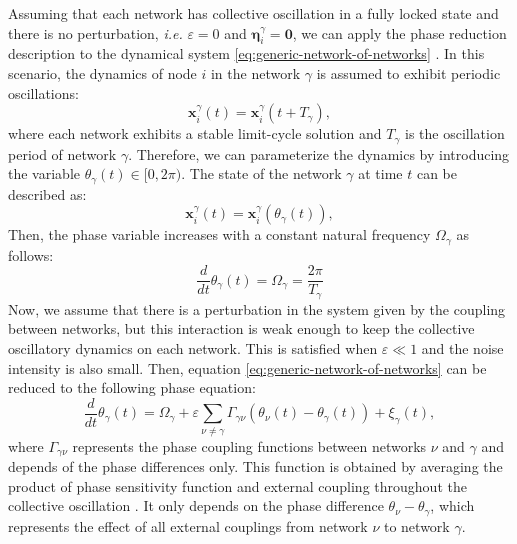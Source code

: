 \documentclass[../main.tex]{subfiles}
\begin{document}
Assuming that each network has collective oscillation in a fully locked state and there is no perturbation, \textit{i.e.} $\varepsilon =0$ and $\mathbf{\eta}_i^\gamma = \mathbf{0}$, we can apply the phase reduction description to the dynamical system \eqref{eq:generic-network-of-networks} \citep{zahid2009predicting,lewis2013cooperative,pikovsky2015dynamics}.
In this scenario, the dynamics of node $i$ in the network $\gamma$ is assumed to exhibit periodic oscillations:
\begin{equation}
    \mathbf{x}_i^{\gamma}(t) = \mathbf{x}_i^{\gamma}(t+T_\gamma),
    \label{eq:phase-reduction}
\end{equation}
where each network exhibits a stable limit-cycle solution and $T_\gamma$ is the oscillation period of network $\gamma$.
Therefore, we can parameterize the dynamics by introducing the variable $\theta_\gamma(t) \in [0,2\pi)$. The state of the network $\gamma$ at time $t$ can be described as:
\begin{equation}
    \mathbf{x}_i^\gamma(t) = \mathbf{x}_i^\gamma(\theta_\gamma(t)),
\end{equation}
Then, the phase variable increases with a constant natural frequency $\Omega_\gamma$ as follows:
\begin{equation}
    \displaystyle\frac{d}{dt}\theta_\gamma(t) = \Omega_\gamma = \displaystyle\frac{2\pi}{T_\gamma}
    \label{eq:phase-reduction-2}
\end{equation}
Now, we assume that there is a perturbation in the system given by the coupling between networks, but this interaction is weak enough to keep the collective oscillatory dynamics on each network.
This is satisfied when $\varepsilon\ll 1$ and the noise intensity is also small.
Then, equation \eqref{eq:generic-network-of-networks} can be reduced to the following phase equation:
\begin{equation}
    \displaystyle\frac{d}{dt}\theta_\gamma(t) = \Omega_\gamma + \varepsilon\displaystyle\sum_{\nu\neq\gamma}\Gamma_{\gamma\nu}(\theta_\nu(t)-\theta_\gamma(t)) + \xi_\gamma(t),
     \label{eq:phase-reduction-3}
\end{equation}
where $\Gamma_{\gamma\nu}$ represents the phase coupling functions between networks $\nu$ and $\gamma$ and depends of the phase differences only.
This function is obtained by averaging the product of phase sensitivity function and external coupling throughout the collective oscillation \citep{kirst_dynamic_2016}.
It only depends on the phase difference $\theta_\nu-\theta_\gamma$, which represents the effect of all external couplings from network $\nu$ to network $\gamma$.
\end{document}
